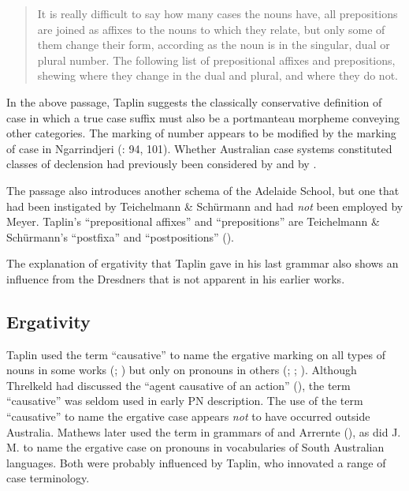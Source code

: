 \begin{quote}
	It is really difficult to say how many cases the nouns have, all prepositions are joined as affixes to the nouns to which they relate, but only some of them change their form, according as the noun is in the singular, dual or plural number. The following list of prepositional affixes and prepositions, shewing where they change in the dual and plural, and where they do not. \citep[8]{taplin_grammar_1878}
\end{quote}

In the above passage, Taplin suggests the classically conservative definition of case in which a true case suffix must also be a portmanteau morpheme conveying other categories. The marking of number appears to be modified by the marking of case in Ngarrindjeri (\citealt{horgen_languages_2004}: 94, 101). Whether Australian case systems constituted classes of declension had previously been considered by \citet[4]{schurmann_letter_1844} and by \citet[5]{moorhouse_vocabulary_1846}.

The passage also introduces another schema of the Adelaide School, but one that had been instigated by Teichelmann \& Schürmann and had \textit{not} been employed by Meyer. Taplin’s “prepositional affixes” and “prepositions” are Teichelmann \& Schürmann’s “postfixa” and “postpositions” ().

The explanation of ergativity that Taplin gave in his last grammar also shows an influence from the Dresdners that is not apparent in his earlier works.

\subsection{Ergativity}
\label{sec:key:7.3.3}\label{bkm:Ref516244764}

Taplin used the term “causative” to name the ergative marking on all types of nouns in some works (\citeyear{taplin_vocabulary_1867}; \citeyear{taplin_grammar_1878}) but only on pronouns in others (\citeyear{taplin_notes_1870}; \citeyear{taplin_notes_1872}; \citeyear{taplin_1879a_nodate}). Although Threlkeld had discussed the “agent causative of an action” (\citeyear{threlkeld_australian_1834}), the term “causative” was seldom used in early PN description. The use of the term “causative” to name the ergative case appears \textit{not} to have occurred outside Australia. Mathews later used the term in grammars of \citet{mathews_wiradyuri_1904} and Arrernte (\citeyear{mathews_arranda_1907}), as did J. M. \citet{black_vocabularies_1920} to name the ergative case on pronouns in vocabularies of South Australian languages. Both were probably influenced by Taplin, who innovated a range of case terminology.

